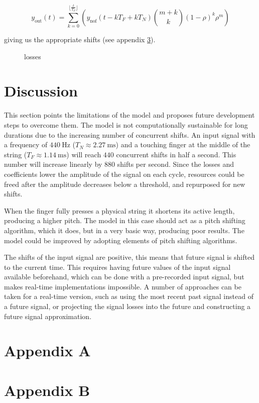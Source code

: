 \documentclass{sigchi}
\begin{document}
\begin{equation} \label{eq:y0}
	y_{\textrm{out}}(t) = \sum_{k=0}^{\lfloor \frac{t}{T_F} \rfloor}\left(y_{\textrm{nof}}(t - kT_F + kT_N)\binom{m+k}{k} (1 - \rho)^{k} \rho^m\right)
\end{equation}

giving us the appropriate shifts (see appendix \ref{appendix:math2}).

\begin{figure}[h]
	\centering
	\caption{
		losses
	}
	\label{fig:losses}
\end{figure}

\section{Discussion}
This section points the limitations of the model and proposes future development steps to overcome them.
The model is not computationally sustainable for long durations due to the increasing number of concurrent shifts.
An input signal with a frequency of $\SI{440}{\hertz}$ ($T_N\approx\SI{2.27}{\milli\second}$) and a touching finger at the middle of the string ($T_F\approx\SI{1.14}{\milli\second}$) will reach $440$ concurrent shifts in half a second.
This number will increase linearly by $880$ shifts per second.
Since the losses and coefficients lower the amplitude of the signal on each cycle, resources could be freed after the amplitude decreases below a threshold, and repurposed for new shifts.

When the finger fully presses a physical string it shortens its active length, producing a higher pitch.
The model in this case should act as a pitch shifting algorithm, which it does, but in a very basic way, producing poor results.
The model could be improved by adopting elements of pitch shifting algorithms.

The shifts of the input signal are positive, this means that future signal is shifted to the current time.
This requires having future values of the input signal available beforehand, which can be done with a pre-recorded input signal, but makes real-time implementations impossible.
A number of approaches can be taken for a real-time version, such as using the most recent past signal instead of a future signal, or projecting the signal losses into the future and constructing a future signal approximation.




\clearpage
\appendix

\section{Appendix A}\label{appendix:math1}


\section{Appendix B}\label{appendix:math2}

\end{document}
